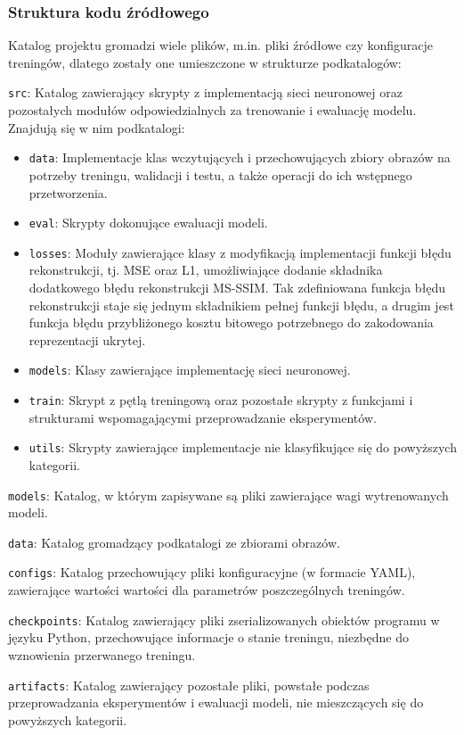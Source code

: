 \subsubsection{Struktura kodu źródłowego}
Katalog projektu gromadzi wiele plików, m.in. pliki źródłowe czy konfiguracje treningów, dlatego zostały one umieszczone w strukturze podkatalogów:
\begin{itemize}
	\item \texttt{src}: Katalog zawierający skrypty z implementacją sieci neuronowej oraz pozostałych modułów odpowiedzialnych za trenowanie i ewaluację modelu. Znajdują się w nim podkatalogi:
	\begin{itemize}
		\item \texttt{data}: Implementacje klas wczytujących i przechowujących zbiory obrazów na potrzeby treningu, walidacji i testu, a także operacji do ich wstępnego przetworzenia.
		\item \texttt{eval}: Skrypty dokonujące ewaluacji modeli.
		\item \texttt{losses}: Moduły zawierające klasy z modyfikacją implementacji funkcji błędu rekonstrukcji, tj. MSE oraz L1, umożliwiające dodanie składnika dodatkowego błędu rekonstrukcji MS-SSIM. Tak zdefiniowana funkcja błędu rekonstrukcji staje się jednym składnikiem pełnej funkcji błędu, a drugim jest funkcja błędu przybliżonego kosztu bitowego potrzebnego do zakodowania reprezentacji ukrytej.
		\item \texttt{models}: Klasy zawierające implementację sieci neuronowej.
		\item \texttt{train}: Skrypt z pętlą treningową oraz pozostałe skrypty z funkcjami i strukturami wspomagającymi przeprowadzanie eksperymentów.
		\item \texttt{utils}: Skrypty zawierające implementacje nie klasyfikujące się do powyższych kategorii.
	\end{itemize}
	\item \texttt{models}: Katalog, w którym zapisywane są pliki zawierające wagi wytrenowanych modeli.
	\item \texttt{data}: Katalog gromadzący podkatalogi ze zbiorami obrazów.
	\item \texttt{configs}: Katalog przechowujący pliki konfiguracyjne (w formacie YAML), zawierające wartości wartości dla parametrów poszczególnych treningów.
	\begin{sloppypar}
	\item \texttt{checkpoints}: Katalog zawierający pliki zserializowanych obiektów programu w języku Python, przechowujące informacje o stanie treningu, niezbędne do wznowienia przerwanego treningu.
	\end{sloppypar}
	\item \texttt{artifacts}: Katalog zawierający pozostałe pliki, powstałe podczas przeprowadzania eksperymentów i ewaluacji modeli, nie mieszczących się do powyższych kategorii.
\end{itemize}

